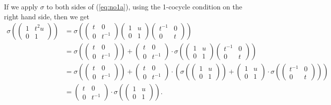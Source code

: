 If we apply $\sigma$ to both sides of (\ref{eq:no1a}), using the 1-cocycle condition on the right hand side, then we get
\begin{align*}
\sigma\left(
\left(\begin{matrix} 1 & t^2u \\ 0 & 1\end{matrix}\right)
\right) &=
\sigma\left(
\left(\begin{matrix} t & 0 \\ 0 & t^{-1}  \end{matrix}\right) 
\left(\begin{matrix} 1 & u \\ 0 & 1 \end{matrix}\right) 
\left(\begin{matrix}  t^{-1} & 0 \\ 0 & t \end{matrix}\right)
\right) 
\\
&=
\sigma\left(
\left(\begin{matrix} t & 0 \\ 0 & t^{-1}  \end{matrix}\right) 
\right) +
\left(\begin{matrix} t & 0 \\ 0 & t^{-1}  \end{matrix}\right) \cdot
\sigma\left(
\left(\begin{matrix} 1 & u \\ 0 & 1 \end{matrix}\right) 
\left(\begin{matrix}  t^{-1} & 0 \\ 0 & t \end{matrix}\right)
\right) 
\\
&= 
\sigma\left(
\left(\begin{matrix} t & 0 \\ 0 & t^{-1}  \end{matrix}\right) 
\right) +
\left(\begin{matrix} t & 0 \\ 0 & t^{-1}  \end{matrix}\right) \cdot
\left(
\sigma\left(
\left(\begin{matrix} 1 & u \\ 0 & 1 \end{matrix}\right) 
\right) +
\left(\begin{matrix} 1 & u \\ 0 & 1 \end{matrix}\right) \cdot
\sigma\left(
\left(\begin{matrix}  t^{-1} & 0 \\ 0 & t \end{matrix}\right)
\right)
\right)
\\
&= 
\left(\begin{matrix} t & 0 \\ 0 & t^{-1}  \end{matrix}\right) \cdot
\sigma\left(
\left(\begin{matrix} 1 & u \\ 0 & 1 \end{matrix}\right) 
\right).
\end{align*}
